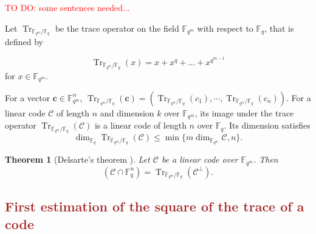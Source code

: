 \documentclass[a4paper]{article}
\newtheorem{thm}{Theorem}
\newcommand{\calC}{\mathcal{C}}
\newcommand{\fqm}{\mathbb{F}_{q^m}}
\newcommand{\fq}{\mathbb{F}_{q}}
\newcommand{\Tr}[1]{\operatorname{Tr}_{\mathbb{F}_{q^m}/\fq}\left(#1\right)}
\newcommand\TODO[1]{\textcolor{red}{TO DO: #1}}
\newcommand\mathieu[1]{\textcolor{brown}{#1}}
\begin{document}
\TODO{some sentences needed...}

Let $\operatorname{Tr}_{\mathbb{F}_{q^m}/\fq}$ be the trace operator on the field $\mathbb{F}_{q^m}$ with respect to $\mathbb{F}_q$, that is defined by

\[
\Tr{x} = x + x^q + ... + x^{q^{m-1}}
\]
for $x \in \fqm$.


For a vector $\mathbf{c} \in \fqm^n$, $\Tr{\mathbf{c}}= (\Tr{c_1},\cdots,\Tr{c_n})$. For a linear code $\calC$ of length $n$ and dimension $k$ over $\mathbb{F}_{q^m}$, its image under the trace operator $\Tr{\calC}$ is a linear code of length $n$ over $\mathbb{F}_q$. Its dimension satisfies
\begin{equation}\label{eq:dim_trace}
\dim_{\mathbb{F}_q} \Tr{\calC} \leq \min\{m\dim_{\fqm} \calC,n\}.
\end{equation}

\begin{thm}[Delsarte's theorem \cite{Del75}] \label{th:delsarte}
Let $\calC$ be a linear code over $\fqm$. Then
\[\left(\calC \cap \fq^n\right) = \Tr{\calC^{\perp}}.\]
\end{thm}
	
\mathieu{
\subsection{First estimation of the square of the trace of a code}}
\end{document}
